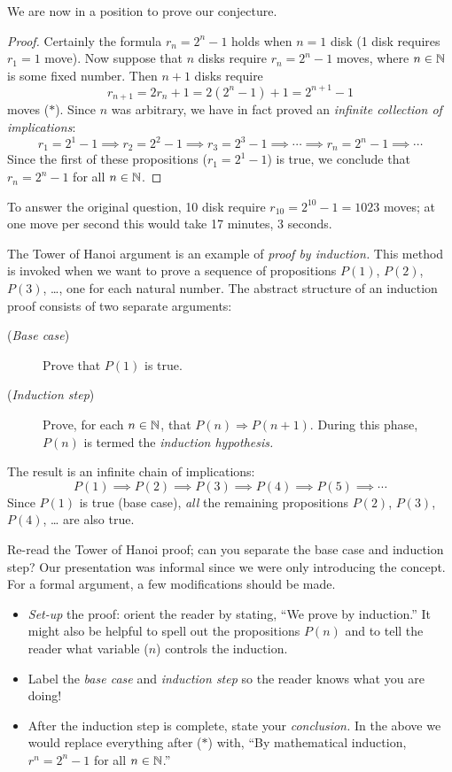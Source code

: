 \goodbreak

We are now in a position to prove our conjecture.

\begin{proof}
	Certainly the formula $r_n=2^n-1$ holds when $n=1$ disk (1 disk requires $r_1=1$ move).\smallbreak
	Now suppose that $n$ disks require $r_n=2^n-1$ moves, where $n\in\mathbb{N}$ is some fixed number. Then $n+1$ disks require
	\[
		r_{n+1}=2r_n+1=2(2^n-1)+1 =2^{n+1}-1
	\]
	moves ($\ast$). Since $n$ was arbitrary, we have in fact proved an \emph{infinite collection of implications}: 
	\[
		r_1=2^1-1\implies r_2=2^2-1\implies r_3=2^3-1 \implies \cdots \implies r_n=2^n-1\implies \cdots
	\]
	Since the first of these propositions ($r_1=2^1-1$) is true, we conclude that $r_n=2^n-1$ for all $n\in\mathbb{N}$.
\end{proof}

To answer the original question, 10 disk require $r_{10}=2^{10}-1=1023$ moves; at one move per second this would take 17 minutes, 3 seconds.




The Tower of Hanoi argument is an example of \emph{proof by induction.} This method is invoked when we want to prove a sequence of propositions $P(1)$, $P(2)$, $P(3)$, \ldots, one for each natural number. The abstract structure of an induction proof consists of two separate arguments:
\begin{description}%
  \item[\normalfont(\emph{Base case})] Prove that $P(1)$ is true.
  \item[\normalfont(\emph{Induction step})] Prove, for each $n\in\mathbb{N}$, that $P(n)\Longrightarrow P(n+1)$. During this phase, $P(n)$ is termed the \emph{induction hypothesis.}
\end{description}
The result is an infinite chain of implications:
\[
	P(1)\implies P(2)\implies P(3)\implies P(4)\implies P(5)\implies \cdots
\]
Since $P(1)$ is true (base case), \emph{all} the remaining propositions $P(2)$, $P(3)$, $P(4)$, \ldots{} are also true.\smallbreak

Re-read the Tower of Hanoi proof; can you separate the base case and induction step? Our presentation was informal since we were only introducing the concept. For a formal argument, a few modifications should be made.

\begin{itemize}
  \item \emph{Set-up} the proof: orient the reader by stating, ``We prove by induction.'' It might also be helpful to spell out the propositions $P(n)$ and to tell the reader what variable ($n$) controls the induction.
  \item Label the \emph{base case} and \emph{induction step} so the reader knows what you are doing!
  \item After the induction step is complete, state your \emph{conclusion.} In the above we would replace everything after ($\ast$) with, ``By mathematical induction, $r^n=2^n-1$ for all $n\in\mathbb{N}$.''
\end{itemize}


